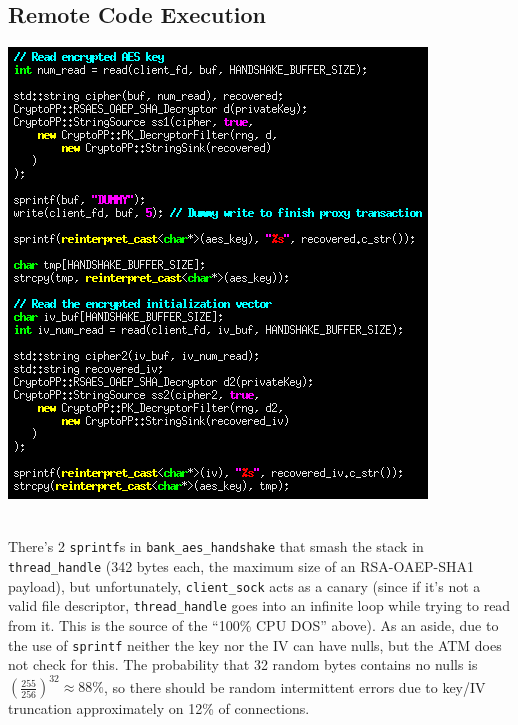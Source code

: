 \documentclass[12pt]{article}
\begin{document}
\subsection*{Remote Code Execution}
\includegraphics[width=\textwidth]{bankscreenshot_cropped.png}
\pagebreak\\
\begin{tikzpicture}

\end{tikzpicture}\\
There's 2 \verb|sprintf|s in \verb|bank_aes_handshake| that smash the stack in \verb|thread_handle| (342 bytes each, the maximum size of an RSA-OAEP-SHA1 payload), but unfortunately, \verb|client_sock| acts as a canary (since if it's not a valid file descriptor, \verb|thread_handle| goes into an infinite loop while trying to read from it. This is the source of the ``100\% CPU DOS'' above).
As an aside, due to the use of \verb|sprintf| neither the key nor the IV can have nulls, but the ATM does not check for this. The probability that 32 random bytes contains no nulls is $(\frac{255}{256})^{32} \approx 88\%$, so there should be random intermittent errors due to key/IV truncation approximately on 12\% of connections.
\end{document}
